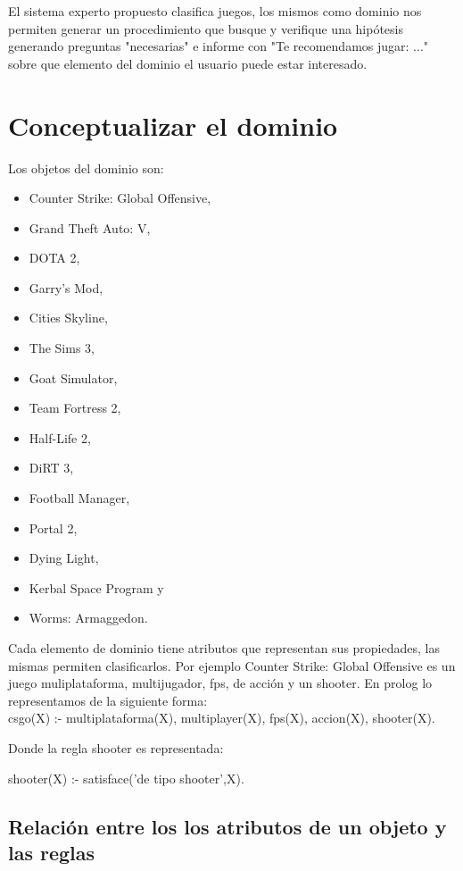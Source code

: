 \documentclass[11pt,oneside,a4paper]{article}
\begin{document}
El sistema experto propuesto clasifica juegos, los mismos como 
dominio nos permiten generar un procedimiento que busque y verifique
una hipótesis generando preguntas "necesarias" e informe con          %
"Te recomendamos jugar: ..." sobre que elemento del dominio el
usuario puede estar interesado.


\section{Conceptualizar el dominio}

Los objetos del dominio son:

\begin{multicols}{2}
\begin{itemize}
\item Counter Strike: Global Offensive,
\item Grand Theft Auto: V,
\item DOTA 2,
\item Garry's Mod,
\item Cities Skyline,
\item The Sims 3,
\item Goat Simulator,
\item Team Fortress 2,
\item Half-Life 2,
\item DiRT 3,
\item Football Manager,
\item Portal 2,
\item Dying Light,
\item Kerbal Space Program y
\item Worms: Armaggedon.
\end{itemize}
\end{multicols}

Cada elemento de dominio tiene atributos que representan sus propiedades, las
mismas permiten clasificarlos. Por ejemplo Counter Strike: Global Offensive
es un juego muliplataforma, multijugador, fps, de acción y un shooter. En prolog 
lo representamos de la siguiente forma:\\

csgo(X) :- multiplataforma(X), multiplayer(X), fps(X), accion(X), shooter(X).

Donde la regla shooter es representada: 

shooter(X) :- satisface('de tipo shooter',X).


\subsection{Relación entre los los atributos de un objeto y las reglas}
\end{document}
